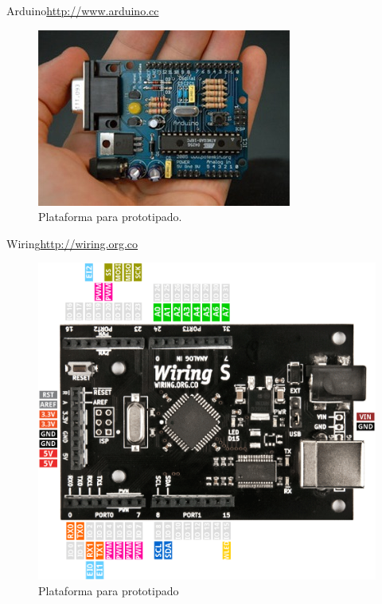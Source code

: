 \documentclass{beamer}
\begin{document}
\begin{frame}{Arduino}{\url{http://www.arduino.cc}}
  \begin{figure}
    \includegraphics[scale=0.6]{img/arduino316}
    \caption{Plataforma para prototipado.}
    \label{fig:arduino}
  \end{figure}
\end{frame}

\begin{frame}{Wiring}{\url{http://wiring.org.co}}
  \begin{figure}
    \centering
    \includegraphics[scale=0.3]{img/wiring}
    \caption{Plataforma para prototipado}
    \label{fig:wiring}
  \end{figure}
\end{frame}
\end{document}
